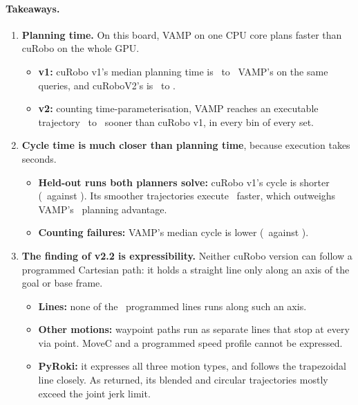 \documentclass[11pt]{article}
\begin{document}
\paragraph{Takeaways.}
\begin{enumerate}
  \item \textbf{Planning time.} On this board, VAMP on one CPU core plans faster than cuRobo on the whole GPU.
  \begin{itemize}
    \item \textbf{v1:} cuRobo v1's median planning time is \vOneRatioMin\ to \vOneRatioMax\ VAMP's on the same queries, and cuRoboV2's is \vTwoRatioMin\ to \vTwoRatioMax.
    \item \textbf{v2:} counting time-parameterisation, VAMP reaches an executable trajectory \readyRatioMin\ to \readyRatioMax\ sooner than cuRobo v1, in every bin of every set.
  \end{itemize}
  \item \textbf{Cycle time is much closer than planning time}, because execution takes seconds.
  \begin{itemize}
    \item \textbf{Held-out runs both planners solve:} cuRobo v1's cycle is shorter (\aBothVOne\ against \aBothVamp). Its smoother trajectories execute \aExecAdv\ faster, which outweighs VAMP's \aReadyAdv\ planning advantage.
    \item \textbf{Counting failures:} VAMP's median cycle is lower (\aVampCycle\ against \aVOneCycle).
  \end{itemize}
  \item \textbf{The finding of v2.2 is expressibility.} Neither cuRobo version can follow a programmed Cartesian path: it holds a straight line only along an axis of the goal or base frame.
  \begin{itemize}
    \item \textbf{Lines:} none of the \ttLinesAll\ programmed lines runs along such an axis.
    \item \textbf{Other motions:} waypoint paths run as separate lines that stop at every via point. MoveC and a programmed speed profile cannot be expressed.
    \item \textbf{PyRoki:} it expresses all three motion types, and follows the trapezoidal line closely. As returned, its blended and circular trajectories mostly exceed the joint jerk limit.
  \end{itemize}
\end{enumerate}
\end{document}
